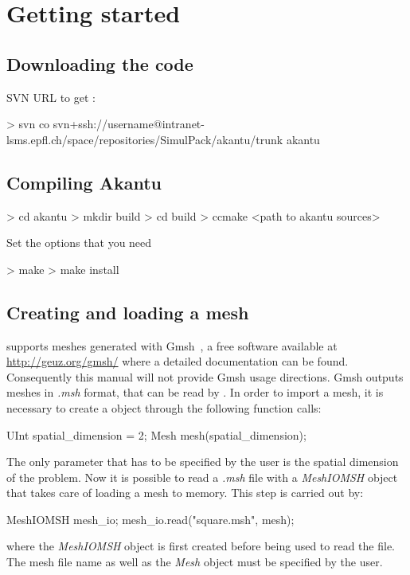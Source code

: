 \chapter{Getting started}
\section{Downloading the code}
SVN URL to get \akantu :
\begin{command}
  > svn co svn+ssh://username@intranet-lsms.epfl.ch/space/repositories/SimulPack/akantu/trunk akantu
\end{command}

\section{Compiling Akantu}
\begin{command}
  > cd akantu
  > mkdir build
  > cd build
  > ccmake <path to akantu sources>
\end{command}

Set the options that you need

\begin{command}
  > make
  > make install
\end{command}

\section{Creating and loading a mesh\label{sect:common:mesh}}

\akantu supports meshes generated with Gmsh~\cite{gmsh}, a free
software available at \url{http://geuz.org/gmsh/} where a detailed 
documentation can be found. Consequently this manual will not provide
Gmsh usage directions. Gmsh outputs meshes in \textit{.msh} format, that can be read
by \akantu. In order to import a mesh, it is necessary to create
a  object through the following function calls:
\begin{cpp}
  UInt spatial_dimension = 2;
  Mesh mesh(spatial_dimension);
\end{cpp}
The only parameter that has to be specified by the user is the spatial
dimension of the problem. Now it is possible to read a \textit{.msh} file with
a \textit{MeshIOMSH} object that takes care of loading a mesh to memory. 
This step is carried out by:
\begin{cpp}
  MeshIOMSH mesh_io;
  mesh_io.read("square.msh", mesh);
\end{cpp}
where the \textit{MeshIOMSH} object is first created before being 
used to read the  file. The mesh file name as well as the \textit{Mesh}
object must be specified by the user. 

